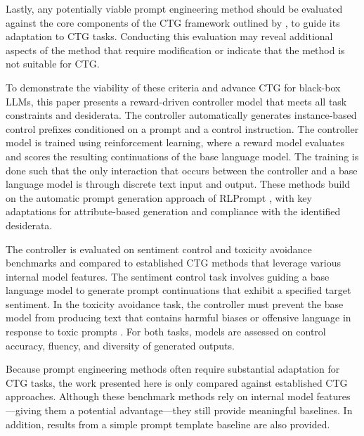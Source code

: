 \documentclass[phd,electronic,oneside,twosidetoc,letterpaper,chaptercenter,parttop,lof]{byumsphd}
\begin{document}
Lastly, any potentially viable prompt engineering method should be evaluated against the core components of the CTG framework outlined by \cite{zhang2023survey}, to guide its adaptation to CTG tasks.
Conducting this evaluation may reveal additional aspects of the method that require modification or indicate that the method is not suitable for CTG.

To demonstrate the viability of these criteria and advance CTG for black-box LLMs, this paper presents a reward-driven controller model that meets all task constraints and desiderata.
The controller automatically generates instance-based control prefixes conditioned on a prompt and a control instruction.
The controller model is trained using reinforcement learning, where a reward model evaluates and scores the resulting continuations of the base language model.
The training is done such that the only interaction that occurs between the controller and a base language model is through discrete text input and output.
These methods build on the automatic prompt generation approach of RLPrompt \cite{deng-etal-2022-rlprompt}, with key adaptations for attribute-based generation and compliance with the identified desiderata.

The controller is evaluated on sentiment control and toxicity avoidance benchmarks and compared to established CTG methods that leverage various internal model features.
The sentiment control task involves guiding a base language model to generate prompt continuations that exhibit a specified target sentiment.
In the toxicity avoidance task, the controller must prevent the base model from producing text that contains harmful biases or offensive language in response to toxic prompts \cite{sheng2019bias, gehman2020toxicity}.
For both tasks, models are assessed on control accuracy, fluency, and diversity of generated outputs.

Because prompt engineering methods often require substantial adaptation for CTG tasks, the work presented here is only compared against established CTG approaches.
Although these benchmark methods rely on internal model features---giving them a potential advantage---they still provide meaningful baselines. In addition, results from a simple prompt template baseline are also provided.
\end{document}

